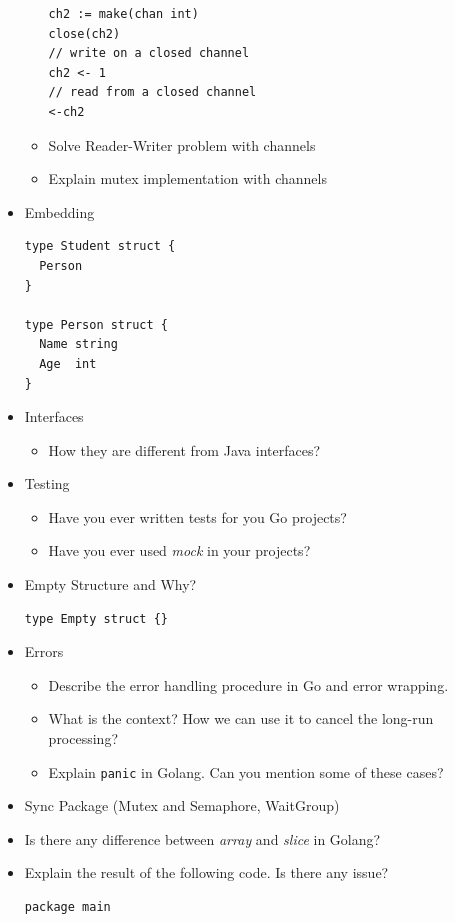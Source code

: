 \documentclass[]{article}
\begin{document}
\begin{multicols}{2}
\begin{itemize}
\begin{itemize}
\begin{verbatim}
ch2 := make(chan int)
close(ch2)
// write on a closed channel
ch2 <- 1
// read from a closed channel
<-ch2
          \end{verbatim}
        \item Solve Reader-Writer problem with channels
        \item Explain mutex implementation with channels
      \end{itemize}

    \item Embedding
      \begin{verbatim}
type Student struct {
  Person
}

type Person struct {
  Name string
  Age  int
}
      \end{verbatim}

    \item Interfaces
      \begin{itemize}
        \item How they are different from Java interfaces?
      \end{itemize}

    \item Testing
      \begin{itemize}
        \item Have you ever written tests for you Go projects?
        \item Have you ever used \textit{mock} in your projects?
      \end{itemize}

    \item Empty Structure and Why?
      \begin{verbatim}
type Empty struct {}
      \end{verbatim}

    \item Errors
      \begin{itemize}
        \item  Describe the error handling procedure in Go and error wrapping.
        \item What is the context? How we can use it to cancel the long-run processing?
        \item Explain \texttt{panic} in Golang. Can you mention some of these cases?
      \end{itemize}

    \item Sync Package (Mutex and Semaphore, WaitGroup)
    \item Is there any difference between \textit{\color{YellowOrange} array} and \textit{\color{YellowOrange} slice} in Golang?
    \item Explain the result of the following code. Is there any issue?
      \begin{verbatim}
package main


\end{verbatim}
\end{itemize}
\end{multicols}
\end{document}
